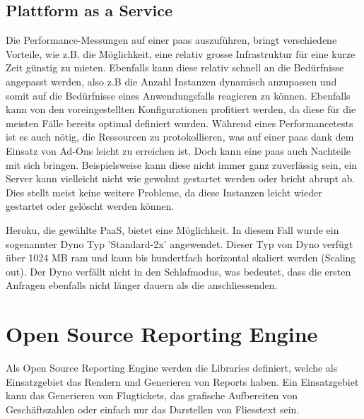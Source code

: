 \documentclass[main.tex]{subfiles}
\begin{document}
\subsection{Plattform as a Service}

Die Performance-Messungen auf einer \acrshort{paas} auszuführen, bringt verschiedene Vorteile, wie z.B. die Möglichkeit, eine relativ grosse Infrastruktur für eine kurze Zeit günstig zu mieten. Ebenfalls kann diese relativ schnell an die Bedürfnisse angepasst werden, also z.B die Anzahl Instanzen dynamisch anzupassen und somit auf die Bedürfnisse eines Anwendungsfalls reagieren zu können. Ebenfalls kann von den voreingestellten Konfigurationen profitiert werden, da diese für die meisten Fälle bereits optimal definiert wurden. Während eines Performancetests ist es auch nötig, die Ressourcen zu protokollieren, was auf einer \acrshort{paas} dank dem Einsatz von Ad-Ons leicht zu erreichen ist. Doch kann eine \acrshort{paas} auch Nachteile mit sich bringen. Beispielsweise kann diese nicht immer ganz zuverlässig sein, ein Server kann vielleicht nicht wie gewohnt gestartet werden oder bricht abrupt ab. Dies stellt meist keine weitere Probleme, da diese Instanzen leicht wieder gestartet oder gelöscht werden können.\cite[Kap.~3]{molyneaux2014art} 


Heroku, die gewählte PaaS, bietet eine Möglichkeit. In diesem Fall wurde ein sogenannter Dyno Typ 'Standard-2x' angewendet. Dieser Typ von Dyno verfügt über 1024 MB \gls{ram} und kann bis hundertfach horizontal skaliert werden (Scaling out). Der Dyno verfällt nicht in den Schlafmodus, was bedeutet, dass die ersten Anfragen ebenfalls nicht länger dauern als die anschliessenden. 



\section{Open Source Reporting Engine }



Als Open Source Reporting Engine werden die Libraries definiert, welche als Einsatzgebiet das Rendern und Generieren von Reports haben. Ein Einsatzgebiet kann das Generieren von Flugtickets, das grafische Aufbereiten von Geschäftszahlen oder einfach nur das Darstellen von Fliesstext sein.
\end{document}
